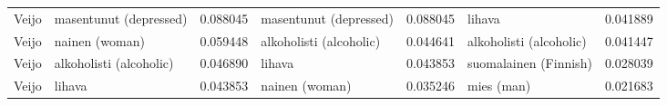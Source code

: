 \begin{tabular}{llrlrlr}
 Veijo &     masentunut (depressed) &                         0.088045 &     masentunut (depressed) &                              0.088045 &                     lihava &                        0.041889 \\
 Veijo &             nainen (woman) &                         0.059448 &    alkoholisti (alcoholic) &                              0.044641 &    alkoholisti (alcoholic) &                        0.041447 \\
 Veijo &    alkoholisti (alcoholic) &                         0.046890 &                     lihava &                              0.043853 &      suomalainen (Finnish) &                        0.028039 \\
 Veijo &                     lihava &                         0.043853 &             nainen (woman) &                              0.035246 &                 mies (man) &                        0.021683 \\
\bottomrule
\end{tabular}
